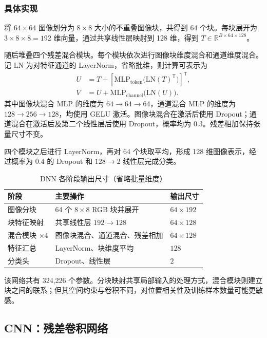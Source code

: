 \documentclass[UTF8,a4paper,zihao=-4,fontset=fandol]{ctexart}
\begin{document}
\subsubsection{具体实现}
将 $64\times64$ 图像划分为 $8\times8$ 大小的不重叠图像块，共得到 $64$ 个块。每块展开为 $3\times8\times8=192$ 维向量，通过共享线性层映射到 128 维，得到 $T\in\mathbb{R}^{B\times64\times128}$。

随后堆叠四个残差混合模块。每个模块依次进行图像块维度混合和通道维度混合。记 $\mathrm{LN}$ 为对特征通道的 LayerNorm，省略批维，则计算可表示为
\begin{align}
 U &= T+\left[\mathrm{MLP}_{\mathrm{token}}\bigl(\mathrm{LN}(T)^{\mathsf T}\bigr)\right]^{\mathsf T},\\
 V &= U+\mathrm{MLP}_{\mathrm{channel}}\bigl(\mathrm{LN}(U)\bigr).
\end{align}
其中图像块混合 MLP 的维度为 $64\rightarrow64\rightarrow64$，通道混合 MLP 的维度为 $128\rightarrow256\rightarrow128$，均使用 GELU 激活。图像块混合在激活后使用 Dropout；通道混合在激活后及第二个线性层后使用 Dropout，概率均为 $0.3$。残差相加保持张量尺寸不变。

四个模块之后进行 LayerNorm，再对 64 个块取平均，形成 128 维图像表示，经过概率为 $0.4$ 的 Dropout 和 $128\rightarrow2$ 线性层完成分类。

\begin{table}[htbp]
\centering\small
\caption{DNN 各阶段输出尺寸（省略批量维度）}
\begin{tabularx}{\textwidth}{lYl}
\toprule
阶段 & 主要操作 & 输出尺寸\\
\midrule
图像分块 & 64 个 $8\times8$ RGB 块并展开 & $64\times192$\\
块特征映射 & 共享线性层 $192\rightarrow128$ & $64\times128$\\
混合模块 $\times4$ & 图像块混合、通道混合、残差相加 & $64\times128$\\
特征汇总 & LayerNorm、块维度平均 & $128$\\
分类头 & Dropout、线性层 & $2$\\
\bottomrule
\end{tabularx}
\end{table}

该网络共有 324,226 个参数。分块映射共享局部输入的处理方式，混合模块则建立块之间的联系；但其空间约束与卷积不同，对位置相关性及训练样本数量可能更敏感。

\subsection{CNN：残差卷积网络}
\end{document}
